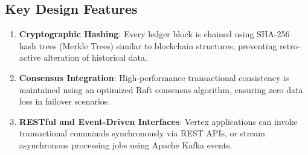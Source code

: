 \subsection{Key Design Features}
\begin{enumerate}
  \item \textbf{Cryptographic Hashing}: Every ledger block is chained using SHA-256 hash trees (Merkle Trees) similar to blockchain structures, preventing retro-active alteration of historical data.
  \item \textbf{Consensus Integration}: High-performance transactional consistency is maintained using an optimized Raft consensus algorithm, ensuring zero data loss in failover scenarios.
  \item \textbf{RESTful and Event-Driven Interfaces}: Vertex applications can invoke transactional commands synchronously via REST APIs, or stream asynchronous processing jobs using Apache Kafka events.
\end{enumerate}
